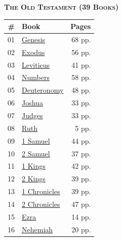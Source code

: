 \documentclass[10pt,letterpaper]{article}
\begin{document}
\noindent
\begin{minipage}[t]{0.485\textwidth}
\centering
{\bfseries\scshape The Old Testament \footnotesize(39 Books)}\\[0.4em]
\begin{tabularx}{\linewidth}{r X r}
\toprule
\textbf{\#} & \textbf{Book} & \textbf{Pages} \\
\midrule
01 & \href{https://cdn.jsdelivr.net/gh/vtrandal/WordofGod@main/books/01_Genesis.pdf}{Genesis} & 68 pp. \\
02 & \href{https://cdn.jsdelivr.net/gh/vtrandal/WordofGod@main/books/02_Exodus.pdf}{Exodus} & 56 pp. \\
03 & \href{https://cdn.jsdelivr.net/gh/vtrandal/WordofGod@main/books/03_Leviticus.pdf}{Leviticus} & 41 pp. \\
04 & \href{https://cdn.jsdelivr.net/gh/vtrandal/WordofGod@main/books/04_Numbers.pdf}{Numbers} & 58 pp. \\
05 & \href{https://cdn.jsdelivr.net/gh/vtrandal/WordofGod@main/books/05_Deuteronomy.pdf}{Deuteronomy} & 48 pp. \\
06 & \href{https://cdn.jsdelivr.net/gh/vtrandal/WordofGod@main/books/06_Joshua.pdf}{Joshua} & 33 pp. \\
07 & \href{https://cdn.jsdelivr.net/gh/vtrandal/WordofGod@main/books/07_Judges.pdf}{Judges} & 33 pp. \\
08 & \href{https://cdn.jsdelivr.net/gh/vtrandal/WordofGod@main/books/08_Ruth.pdf}{Ruth} & 5 pp. \\
09 & \href{https://cdn.jsdelivr.net/gh/vtrandal/WordofGod@main/books/09_1_Samuel.pdf}{1 Samuel} & 44 pp. \\
10 & \href{https://cdn.jsdelivr.net/gh/vtrandal/WordofGod@main/books/10_2_Samuel.pdf}{2 Samuel} & 37 pp. \\
11 & \href{https://cdn.jsdelivr.net/gh/vtrandal/WordofGod@main/books/11_1_Kings.pdf}{1 Kings} & 42 pp. \\
12 & \href{https://cdn.jsdelivr.net/gh/vtrandal/WordofGod@main/books/12_2_Kings.pdf}{2 Kings} & 39 pp. \\
13 & \href{https://cdn.jsdelivr.net/gh/vtrandal/WordofGod@main/books/13_1_Chronicles.pdf}{1 Chronicles} & 39 pp. \\
14 & \href{https://cdn.jsdelivr.net/gh/vtrandal/WordofGod@main/books/14_2_Chronicles.pdf}{2 Chronicles} & 47 pp. \\
15 & \href{https://cdn.jsdelivr.net/gh/vtrandal/WordofGod@main/books/15_Ezra.pdf}{Ezra} & 14 pp. \\
16 & \href{https://cdn.jsdelivr.net/gh/vtrandal/WordofGod@main/books/16_Nehemiah.pdf}{Nehemiah} & 20 pp. \\

\end{tabularx}
\end{minipage}
\end{document}
